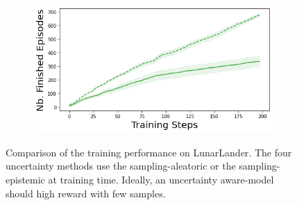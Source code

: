 \begin{figure}
\begin{subfigure}{.245\textwidth}
    \end{subfigure}
    \begin{subfigure}{.245\textwidth}
        \includegraphics[width=\textwidth]{sections/011_icml2022/resources/lunarlander-n_finished_training_episodes-postnet-training-strategy.png}
    \end{subfigure}
    \caption{Comparison of the training performance on LunarLander. The four uncertainty methods use the sampling-aleatoric or the sampling-epistemic at training time. Ideally, an uncertainty aware-model should high reward with few samples.}
    \label{fig:strategy-training-performance-lunarlander}
\end{figure}